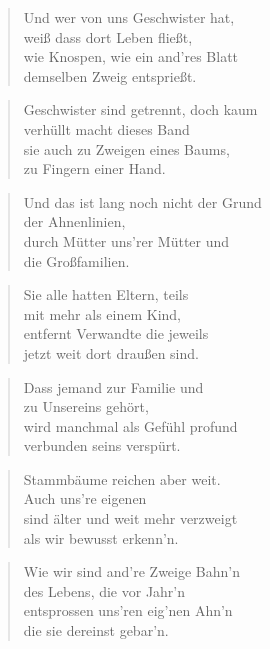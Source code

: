 \documentclass[10pt,a4paper]{article}
\begin{document}
\begin{paracol}{2}
\begin{verse}
Und wer von uns Geschwister hat, \\
weiß dass dort Leben fließt, \\
wie Knospen, wie ein and’res Blatt \\
demselben Zweig entsprießt. \\
\end{verse}

\begin{verse}
Geschwister sind getrennt, doch kaum \\
verhüllt macht dieses Band \\
sie auch zu Zweigen eines Baums, \\
zu Fingern einer Hand. \\
\end{verse}

\begin{verse}
Und das ist lang noch nicht der Grund \\
der Ahnenlinien, \\
durch Mütter uns’rer Mütter und \\
die Großfamilien. \\
\end{verse}

\begin{verse}
Sie alle hatten Eltern, teils \\
mit mehr als einem Kind, \\
entfernt Verwandte die jeweils \\
jetzt weit dort draußen sind. \\
\end{verse}

\begin{verse}
Dass jemand zur Familie und \\
zu Unsereins gehört, \\
wird manchmal als Gefühl profund \\
verbunden seins verspürt. \\
\end{verse}

\begin{verse}
Stammbäume reichen aber weit. \\
Auch uns’re eigenen \\
sind älter und weit mehr verzweigt \\
als wir bewusst erkenn’n. \\
\end{verse}

\begin{verse}
Wie wir sind and’re Zweige Bahn’n \\
des Lebens, die vor Jahr’n \\
entsprossen uns’ren eig’nen Ahn’n \\
die sie dereinst gebar’n. \\
\end{verse}


\end{paracol}
\end{document}
